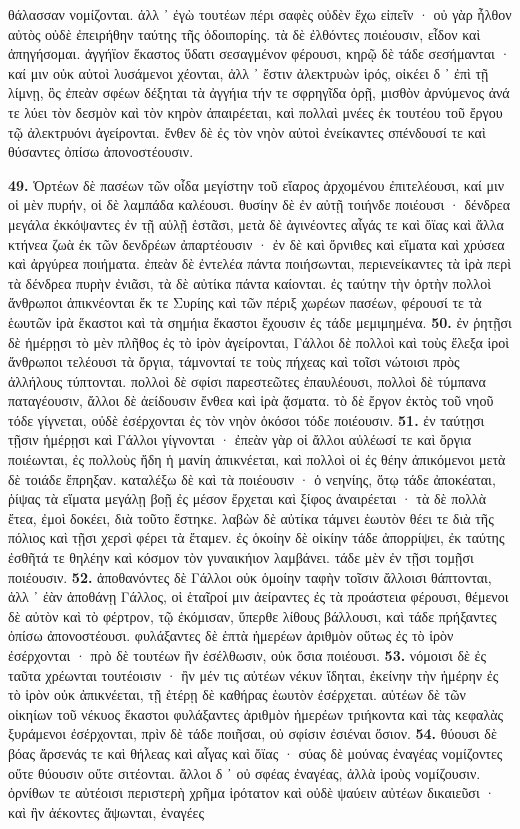 \documentclass[a4paper, 11pt, oneside, polutonikogreek, german]{article}
\begin{document}
θάλασσαν νομίζονται. ἀλλ ᾽ ἐγὼ τουτέων πέρι σαφὲς οὐδὲν ἔχω εἰπεῖν · οὐ γὰρ ἦλθον αὐτὸς οὐδὲ ἐπειρήθην ταύτης τῆς ὁδοιπορίης. τὰ δὲ ἐλθόντες ποιέουσιν, εἶδον καὶ ἀπηγήσομαι. ἀγγήϊον ἕκαστος ὕδατι σεσαγμένον φέρουσι, κηρῷ δὲ τάδε σεσήμανται · καί μιν οὐκ αὐτοὶ λυσάμενοι χέονται, ἀλλ ᾽ ἔστιν ἀλεκτρυὼν ἱρός, οἰκέει δ ᾽ ἐπὶ τῇ λίμνῃ, ὃς ἐπεὰν σφέων δέξηται τὰ ἀγγήια τήν τε σφρηγῖδα ὁρῇ, μισθὸν ἀρνύμενος ἀνά τε λύει τὸν δεσμὸν καὶ τὸν κηρὸν ἀπαιρέεται, καὶ πολλαὶ μνέες ἐκ τουτέου τοῦ ἔργου τῷ ἀλεκτρυόνι ἀγείρονται. ἔνθεν δὲ ἐς τὸν νηὸν αὐτοὶ ἐνείκαντες σπένδουσί τε καὶ θύσαντες ὀπίσω ἀπονοστέουσιν.

\textbf{49.} Ὁρτέων δὲ πασέων τῶν οἶδα μεγίστην τοῦ εἴαρος ἀρχομένου ἐπιτελέουσι, καί μιν οἱ μὲν πυρήν, οἱ δὲ λαμπάδα καλέουσι. θυσίην δὲ ἐν αὐτῇ τοιήνδε ποιέουσι · δένδρεα μεγάλα ἐκκόψαντες ἐν τῇ αὐλῇ ἑστᾶσι, μετὰ δὲ ἀγινέοντες αἶγάς τε καὶ ὄϊας καὶ ἄλλα κτήνεα ζωὰ ἐκ τῶν δενδρέων ἀπαρτέουσιν · ἐν δὲ καὶ ὄρνιθες καὶ εἵματα καὶ χρύσεα καὶ ἀργύρεα ποιήματα. ἐπεὰν δὲ ἐντελέα πάντα ποιήσωνται, περιενείκαντες τὰ ἱρὰ περὶ τὰ δένδρεα πυρὴν ἐνιᾶσι, τὰ δὲ αὐτίκα πάντα καίονται. ἐς ταύτην τὴν ὁρτὴν πολλοὶ ἄνθρωποι ἀπικνέονται ἔκ τε Συρίης καὶ τῶν πέριξ χωρέων πασέων, φέρουσί τε τὰ ἑωυτῶν ἱρὰ ἕκαστοι καὶ τὰ σημήια ἕκαστοι ἔχουσιν ἐς τάδε μεμιμημένα. \textbf{50.} ἐν ῥητῇσι δὲ ἡμέρῃσι τὸ μὲν πλῆθος ἐς τὸ ἱρὸν ἀγείρονται, Γάλλοι δὲ πολλοὶ καὶ τοὺς ἔλεξα ἱροὶ ἄνθρωποι τελέουσι τὰ ὄργια, τάμνονταί τε τοὺς πήχεας καὶ τοῖσι νώτοισι πρὸς ἀλλήλους τύπτονται. πολλοὶ δὲ σφίσι παρεστεῶτες ἐπαυλέουσι, πολλοὶ δὲ τύμπανα παταγέουσιν, ἄλλοι δὲ ἀείδουσιν ἔνθεα καὶ ἱρὰ ᾄσματα. τὸ δὲ ἔργον ἐκτὸς τοῦ νηοῦ τόδε γίγνεται, οὐδὲ ἐσέρχονται ἐς τὸν νηὸν ὁκόσοι τόδε ποιέουσιν. \textbf{51.} ἐν ταύτῃσι τῇσιν ἡμέρῃσι καὶ Γάλλοι γίγνονται · ἐπεὰν γὰρ οἱ ἄλλοι αὐλέωσί τε καὶ ὄργια ποιέωνται, ἐς πολλοὺς ἤδη ἡ μανίη ἀπικνέεται, καὶ πολλοὶ οἱ ἐς θέην ἀπικόμενοι μετὰ δὲ τοιάδε ἔπρηξαν. καταλέξω δὲ καὶ τὰ ποιέουσιν · ὁ νεηνίης, ὅτῳ τάδε ἀποκέαται, ῥίψας τὰ εἵματα μεγάλῃ βοῇ ἐς μέσον ἔρχεται καὶ ξίφος ἀναιρέεται · τὰ δὲ πολλὰ ἔτεα, ἐμοὶ δοκέει, διὰ τοῦτο ἕστηκε. λαβὼν δὲ αὐτίκα τάμνει ἑωυτὸν θέει τε διὰ τῆς πόλιος καὶ τῇσι χερσὶ φέρει τὰ ἔταμεν. ἐς ὁκοίην δὲ οἰκίην τάδε ἀπορρίψει, ἐκ ταύτης ἐσθῆτά τε θηλέην καὶ κόσμον τὸν γυναικήιον λαμβάνει. τάδε μὲν ἐν τῇσι τομῇσι ποιέουσιν. \textbf{52.} ἀποθανόντες δὲ Γάλλοι οὐκ ὁμοίην ταφὴν τοῖσιν ἄλλοισι θάπτονται, ἀλλ ᾽ ἐὰν ἀποθάνῃ Γάλλος, οἱ ἑταῖροί μιν ἀείραντες ἐς τὰ προάστεια φέρουσι, θέμενοι δὲ αὐτὸν καὶ τὸ φέρτρον, τῷ ἐκόμισαν, ὕπερθε λίθους βάλλουσι, καὶ τάδε πρήξαντες ὀπίσω ἀπονοστέουσι. φυλάξαντες δὲ ἑπτὰ ἡμερέων ἀριθμὸν οὕτως ἐς τὸ ἱρὸν ἐσέρχονται · πρὸ δὲ τουτέων ἢν ἐσέλθωσιν, οὐκ ὅσια ποιέουσι. \textbf{53.} νόμοισι δὲ ἐς ταῦτα χρέωνται τουτέοισιν · ἢν μέν τις αὐτέων νέκυν ἴδηται, ἐκείνην τὴν ἡμέρην ἐς τὸ ἱρὸν οὐκ ἀπικνέεται, τῇ ἑτέρῃ δὲ καθήρας ἑωυτὸν ἐσέρχεται. αὐτέων δὲ τῶν οἰκηίων τοῦ νέκυος ἕκαστοι φυλάξαντες ἀριθμὸν ἡμερέων τριήκοντα καὶ τὰς κεφαλὰς ξυράμενοι ἐσέρχονται, πρὶν δὲ τάδε ποιῆσαι, οὐ σφίσιν ἐσιέναι ὅσιον. \textbf{54.} θύουσι δὲ βόας ἄρσενάς τε καὶ θήλεας καὶ αἶγας καὶ ὄϊας · σύας δὲ μούνας ἐναγέας νομίζοντες οὔτε θύουσιν οὔτε σιτέονται. ἄλλοι δ ᾽ οὐ σφέας ἐναγέας, ἀλλὰ ἱροὺς νομίζουσιν. ὀρνίθων τε αὐτέοισι περιστερὴ χρῆμα ἱρότατον καὶ οὐδὲ ψαύειν αὐτέων δικαιεῦσι · καὶ ἢν ἀέκοντες ἅψωνται, ἐναγέες 
\end{document}
